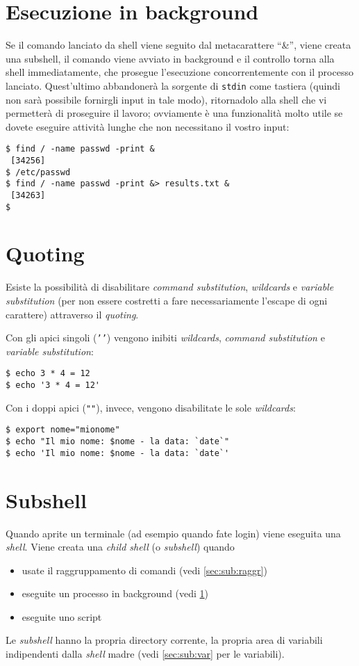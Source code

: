 \section{Esecuzione in background}
\label{sec:sub:backg}
Se il comando lanciato da shell viene seguito dal metacarattere ``\&'', viene
creata una subshell, il comando viene avviato in background e il controllo
torna alla shell immediatamente, che prosegue l'esecuzione concorrentemente
con il processo lanciato. Quest'ultimo abbandoner\`a la sorgente di
\texttt{stdin} come tastiera (quindi non sar\`a possibile fornirgli input in
tale modo), ritornadolo alla shell che vi permetter\`a di proseguire il
lavoro; ovviamente \`e una funzionalit\`a molto utile se dovete eseguire
attivit\`a lunghe che non necessitano il vostro input:
\begin{verbatim}
$ find / -name passwd -print &
 [34256]
$ /etc/passwd
$ find / -name passwd -print &> results.txt &
 [34263]
$
\end{verbatim}

\section{Quoting}
Esiste la possibilit\`a di disabilitare \emph{command substitution},
\emph{wildcards} e \emph{variable substitution} (per non essere costretti a
fare necessariamente l'escape di ogni carattere) attraverso il \emph{quoting}.

Con gli apici singoli (\texttt{'{}'}) vengono inibiti \emph{wildcards},
\emph{command substitution} e \emph{variable substitution}:
\begin{verbatim}
$ echo 3 * 4 = 12
$ echo '3 * 4 = 12'
\end{verbatim}

Con i doppi apici (\texttt{""}), invece, vengono disabilitate le sole
\emph{wildcards}:
\begin{verbatim}
$ export nome="mionome"
$ echo "Il mio nome: $nome - la data: `date`"
$ echo 'Il mio nome: $nome - la data: `date`'
\end{verbatim}

\section{Subshell}
Quando aprite un terminale (ad esempio quando fate login) viene eseguita una
\emph{shell}. Viene creata una \emph{child shell} (o \emph{subshell}) quando
\begin{itemize}
	\item usate il raggruppamento di comandi (vedi \ref{sec:sub:raggr})
	\item eseguite un processo in background (vedi \ref{sec:sub:backg})
	\item eseguite uno script
\end{itemize}
Le \emph{subshell} hanno la propria directory corrente, la propria area di
variabili indipendenti dalla \emph{shell} madre (vedi \ref{sec:sub:var} per le
variabili).

